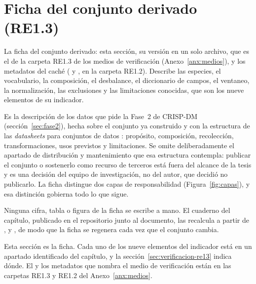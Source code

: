 \section{Ficha del conjunto derivado (RE1.3)}
\label{sec:re13}

 La ficha del conjunto derivado: esta sección, su versión en un
solo archivo, que es el  de la carpeta RE1.3 de los medios de
verificación (Anexo~\ref{anx:medios}), y los metadatos del caché
( y , en la carpeta RE1.2).
Describe las \nSpecies{} especies, el vocabulario, la composición, el desbalance,
el diccionario de campos, el ventaneo, la normalización, las exclusiones y las
limitaciones conocidas, que son los nueve elementos de su indicador.

 Es la descripción de los datos que pide la Fase~2 de
CRISP-DM (sección~\ref{sec:fase2}), hecha sobre el conjunto ya construido y con la
estructura de las \textit{datasheets} para conjuntos de datos
\citep{gebru_2021}: propósito, composición, recolección, transformaciones, usos
previstos y limitaciones. Se omite deliberadamente el apartado de distribución y mantenimiento
que esa estructura contempla: publicar el conjunto o sostenerlo como recurso de
terceros está fuera del alcance de la tesis y es una decisión del equipo de
investigación, no del autor, que decidió no publicarlo. La ficha distingue dos capas de responsabilidad
(Figura~\ref{fig:capas}), y esa distinción gobierna todo lo que sigue.

 Ninguna cifra, tabla o figura de la ficha se escribe a
mano. El cuaderno del capítulo, publicado en el repositorio junto al documento,
las recalcula a partir de ,  y
, de modo que la ficha se regenera cada vez que el conjunto
cambia.

 Esta sección es la ficha. Cada uno de los nueve
elementos del indicador está en un apartado identificado del capítulo, y la
sección~\ref{sec:verificacion-re13} indica dónde. El  y los
metadatos que nombra el medio de verificación están en las carpetas RE1.3 y RE1.2
del Anexo~\ref{anx:medios}.

